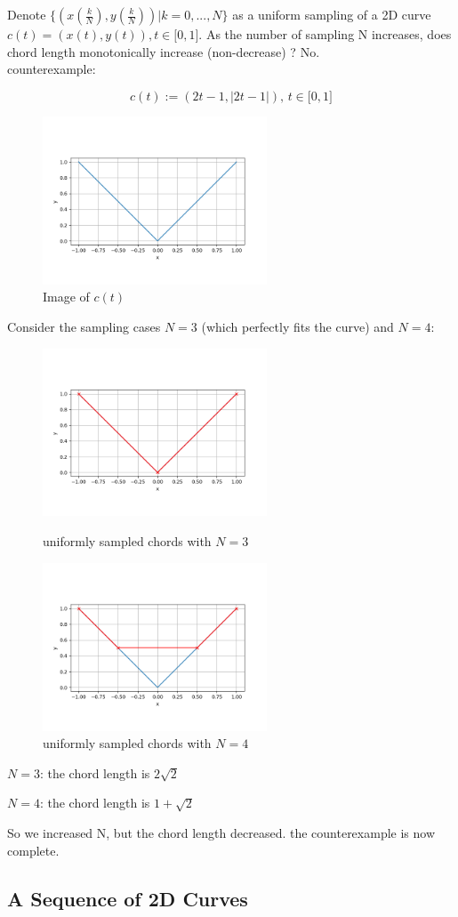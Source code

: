 \documentclass{scrartcl}
\begin{document}
Denote $\{(x(\frac{k}{N}), y(\frac{k}{N}))|k=0,...,N\}$ as a uniform sampling of a 2D curve
$c(t) = (x(t), y(t)), t \in \big[0,1\big]$. As the number of sampling N increases, does chord length monotonically
increase (non-decrease) ? No. \\
counterexample:

\begin{equation}
c(t):=(2t-1, |2t-1|),\, t	\in \big[0,1\big]
\end{equation}

\begin{figure}[h]
	\centering
	\includegraphics[height=5cm]{figures/plot_abs_function.png}
	\caption{Image of $c(t)$}
	\label{fig:abs}
\end{figure}

Consider the sampling cases $N=3$ (which perfectly fits the curve) and $N=4$:

\begin{figure}[h]
\centering
\begin{minipage}{.5\textwidth}
	\centering
	\includegraphics[height=5cm]{figures/plot_abs_function_n3.png}
	\caption{uniformly sampled chords with $N=3$}
	\label{fig:abs_n3}
\end{minipage}%
\begin{minipage}{.5\textwidth}
	\centering
	\includegraphics[height=5cm]{figures/plot_abs_function_n4.png}
	\caption{uniformly sampled chords with $N=4$}
	\label{fig:abs_n4}
\end{minipage}
\end{figure}

$N=3$: the chord length is $2\sqrt{2}$

$N=4$: the chord length is $1 + \sqrt{2}$

So we increased N, but the chord length decreased. the counterexample is now complete.


\subsection{A Sequence of 2D Curves}
	
\end{document}
